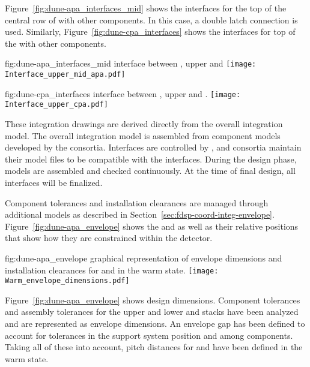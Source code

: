 Figure~\ref{fig:dune-apa_interfaces_mid} shows the interfaces for the
top of the central row of  with other components. In this case, a
double latch connection is used. Similarly,
Figure~\ref{fig:dune-cpa_interfaces} shows the interfaces for top of the
 with other components.
\begin{dunefigure}{fig:dune-apa_interfaces_mid}
  { interface between , upper  and }
  \texttt{[image: Interface\_upper\_mid\_apa.pdf]}
\end{dunefigure}
\begin{dunefigure}
    {fig:dune-cpa_interfaces}
  { interface between , upper  and .}
  \texttt{[image: Interface\_upper\_cpa.pdf]}
\end{dunefigure}

These integration drawings are derived directly from the overall
integration model. The overall integration model is assembled from
component models developed by the consortia. Interfaces are controlled
by , and consortia maintain their model files to be
compatible with the interfaces. During the design phase, models are
assembled and checked continuously. At the time of final design, all
interfaces will be finalized.


Component tolerances and installation clearances are managed through
additional models as described in
Section~\ref{sec:fdsp-coord-integ-envelope}.
Figure~\ref{fig:dune-apa_envelope} shows the  and
 as well as their relative positions that show how they are
constrained within the detector.
\begin{dunefigure}
    {fig:dune-apa_envelope} { graphical
    representation of envelope dimensions and installation clearances
    for  and  in the warm state.}
  \texttt{[image: Warm\_envelope\_dimensions.pdf]}
\end{dunefigure}



Figure~\ref{fig:dune-apa_envelope} shows design dimensions. Component
tolerances and assembly tolerances for the upper and lower
 and  stacks have been analyzed and are
represented as envelope dimensions. An envelope gap has been defined
to account for tolerances in the support system position and among
components. Taking all of these into account, pitch distances for
 and  have been defined in the warm state.

